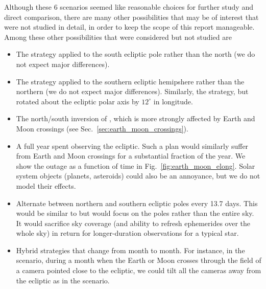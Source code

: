 Although these 6 scenarios seemed like reasonable choices for further study and direct
comparison, there are many other possibilities that may be of interest
that were not studied in detail, in order to keep the scope of this
report manageable.  Among these other possibilities that were considered but not studied are
\begin{itemize}
	\item The \npole\:strategy applied to the south ecliptic pole rather than the north (we do not expect major differences).
	\item The \nhemi\:strategy applied to the southern ecliptic hemipshere rather than the northern (we do not expect major differences).
	Similarly, the \nhemi\:strategy, but rotated about the ecliptic polar axis by
	$12^\circ$ in longitude.
	\item The north/south inversion of \shemiAvoid, which is more strongly affected by Earth and Moon crossings (see Sec.~\ref{sec:earth_moon_crossings}).
	\item A full year spent observing the ecliptic.  Such a plan would similarly 
	suffer from Earth and Moon crossings for a substantial fraction of the year.
	We show the outage as a function of time in Fig.~\ref{fig:earth_moon_elong}.
	Solar system objects (planets, asteroids) could also be an annoyance, but
	we do not model their effects.
        \item Alternate between northern and southern ecliptic poles every 13.7 days.
        This would be similar to \hemis\:but would focus on the poles rather than the entire sky.
        It would sacrifice sky coverage (and ability to refresh ephemerides over the whole sky) in return for longer-duration observations for a typical star.
        \item Hybrid strategies that change from month to month.  For instance, in the \nhemi\:scenario, during a month when the Earth or Moon crosses through the field of a camera pointed close to the ecliptic, we could tilt all the cameras away from the ecliptic as in the \npole\:scenario.        
\end{itemize}
